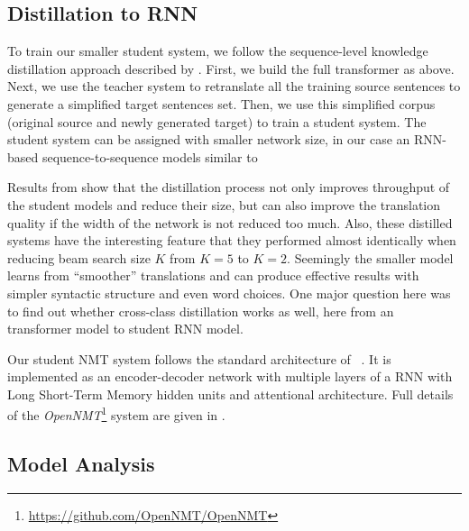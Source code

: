 \documentclass[11pt,a4paper]{article}
\begin{document}
\subsection{Distillation to RNN}
\label{distill}

To train our smaller student system, we follow the sequence-level
knowledge distillation approach described by
. First, we build the full transformer as
above. Next, we use the teacher system to retranslate all the training
source sentences to generate a simplified target sentences set.  Then,
we use this simplified corpus (original source and newly generated
target) to train a student system.  The student system can be assigned
with smaller network size, in our case an RNN-based
sequence-to-sequence models similar to 

Results from  show that the
distillation process not only improves throughput of the student
models and reduce their size, but can also improve the translation
quality if the width of the network is not reduced too much. Also,
these distilled systems have the interesting feature that they
performed almost identically when reducing beam search size $K$ from
$K=5$ to $K=2$. Seemingly the smaller model learns from ``smoother''
translations and can produce effective results with simpler syntactic
structure and even word choices. One major question here was to find
out whether cross-class distillation works as well, here from an
transformer model to student RNN model.

Our student NMT system follows the standard architecture of
~. It is implemented as an
encoder-decoder network with multiple layers of a RNN with Long
Short-Term Memory hidden \cite{Hochreiter:1997:LSM:1246443.1246450} units and attentional architecture. Full details of the
\textit{OpenNMT}\footnote{\url{https://github.com/OpenNMT/OpenNMT}}
system are given in .


\subsection{Model Analysis}
\label{seq2seq}
\end{document}
